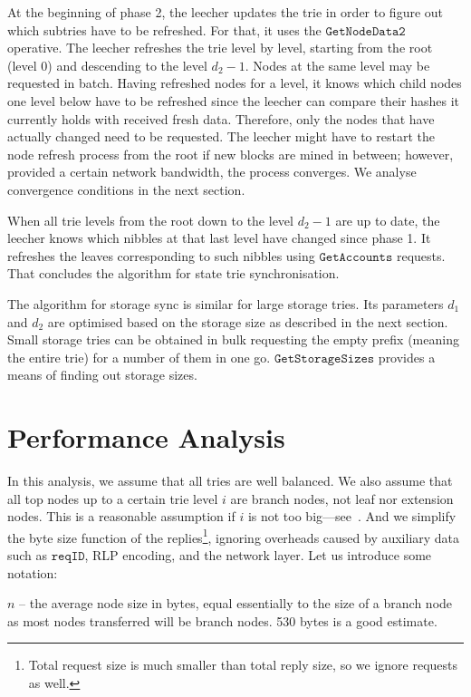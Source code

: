 \documentclass{amsart}
\begin{document}
At the beginning of phase 2, the leecher updates the trie in order to figure out which subtries have to be refreshed.
For that, it uses the $\texttt{GetNodeData2}$ operative.
The leecher refreshes the trie level by level, starting from the root (level 0) and descending to the level $d_2 - 1$.
Nodes at the same level may be requested in batch.
Having refreshed nodes for a level, it knows which child nodes one level below have to be refreshed since the leecher can compare their hashes it currently holds with received fresh data.
Therefore, only the nodes that have actually changed need to be requested.
The leecher might have to restart the node refresh process from the root if new blocks are mined in between;
however, provided a certain network bandwidth, the process converges.
We analyse convergence conditions in the next section.

When all trie levels from the root down to the level $d_2 - 1$ are up to date,
the leecher knows which nibbles at that last level have changed since phase 1.
It refreshes the leaves corresponding to such nibbles using $\texttt{GetAccounts}$ requests. 
That concludes the algorithm for state trie synchronisation.

The algorithm for storage sync is similar for large storage tries.
Its parameters $d_1$ and $d_2$ are optimised based on the storage size as described in the next section.
Small storage tries can be obtained in bulk requesting the empty prefix (meaning the entire trie) for a number of them in one go.
$\texttt{GetStorageSizes}$ provides a means of finding out storage sizes.

\section{Performance Analysis}

In this analysis, we assume that all tries are well balanced.
We also assume that all top nodes up to a certain trie level $i$ are branch nodes, not leaf nor extension nodes.
This is a reasonable assumption if $i$ is not too big---see~\cite{akhunov_1x_workshop_part2}.
And we simplify the byte size function of the replies\footnote{Total
request size is much smaller than total reply size, so we ignore requests as well.},
ignoring overheads caused by auxiliary data such as $\texttt{reqID}$,
RLP encoding, and the network layer.
Let us introduce some notation:

$n$ -- the average node size in bytes,
equal essentially to the size of a branch node as most nodes transferred will be branch nodes.
530 bytes is a good estimate.
\end{document}
